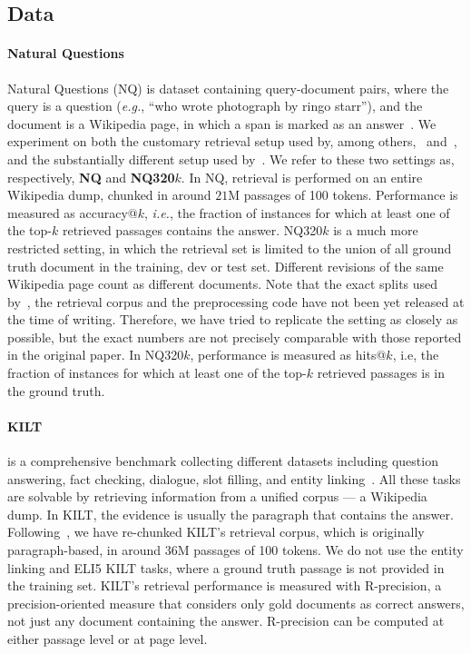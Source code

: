 \documentclass[11pt]{article}
\newcommand{\eg}{\textit{e.g.}}
\newcommand{\ie}{\textit{i.e.}}
\begin{document}
\subsection{Data}
\label{sec:exp-data}

\paragraph{Natural Questions}
Natural Questions (NQ) is dataset containing query-document pairs, where the query is a question (\eg, ``who wrote photograph by ringo starr''), and the document is a Wikipedia page, in which a span is marked as an answer~\citep{kwiatkowski-etal-2019-natural}. We experiment on both the customary retrieval setup used by, among others,~\citet{karpukhin-etal-2020-dense} and~\citet{mao-etal-2021-generation}, and the substantially different setup used by~\citet{tay-etal-2022-transformer}. We refer to these two settings as, respectively, \textbf{NQ} and \textbf{NQ320$k$}. In NQ, retrieval is performed on an entire Wikipedia dump, chunked in around $21$M passages of 100 tokens. Performance is measured as accuracy@$k$, \ie, the fraction of instances for which at least one of the top-$k$ retrieved passages contains the answer. NQ320$k$ is a much more restricted setting, in which the retrieval set is limited to the union of all ground truth document in the training, dev or test set. Different revisions of the same Wikipedia page count as different documents. Note that the exact splits used by~\citet{tay-etal-2022-transformer}, the retrieval corpus and the preprocessing code have not been yet released at the time of writing. Therefore, we have tried to replicate the setting as closely as possible, 
 but the exact numbers are not precisely comparable with those reported in the original paper. In NQ320$k$, performance is measured as hits@$k$, i.e, the fraction of instances for which at least one of the top-$k$ retrieved passages is in the ground truth.

\paragraph{KILT} is a comprehensive benchmark collecting different datasets including question answering, fact checking, dialogue, slot filling, and entity linking~\citep{petroni-etal-2021-kilt}. All these tasks are solvable by retrieving information from a unified corpus --- a Wikipedia dump. In KILT, the evidence is usually the paragraph that contains the answer. Following~\citet{maillard-etal-2021-multi}, we have re-chunked KILT's retrieval corpus, which is originally paragraph-based, in around $36$M passages of 100 tokens. We do not use the entity linking and  ELI5 KILT tasks, where a ground truth passage is not provided in the training set. KILT's retrieval performance is measured with R-precision, a precision-oriented measure that considers only gold documents as correct answers, not just any document containing the answer. R-precision can be computed at either passage level or at page level.
\end{document}
